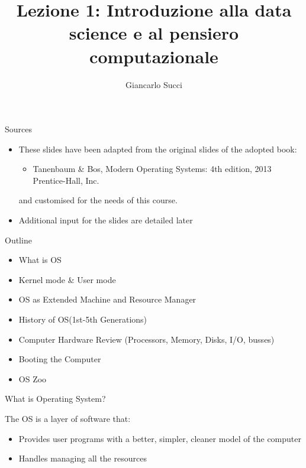 \documentclass{beamer}
\title[L01]{Lezione 1: Introduzione alla data science e al pensiero computazionale} %
\author[{\tiny Giancarlo Succi }]{Giancarlo Succi } %
\institute[unibo] %
\date{Week 01 - Lecture

Chapter 1.1-1.4 \& 1.8, C} %
\begin{document}
\begin{frame}
\titlepage %
\end{frame}



\begin{frame}
{\centerline{Sources}}
\begin{itemize}
    \item These slides have been adapted from the original slides of the adopted book: 
    \begin{itemize}
    \item Tanenbaum \& Bos, Modern  Operating Systems: 4th edition, 2013 Prentice-Hall, Inc.
    \end{itemize}
    and customised for the needs of this course.
    \item Additional input for the slides are detailed later
\end{itemize}
\end{frame}

\begin{frame}
{\centerline{Outline}}
\begin{itemize}
    \item What is OS
    \item Kernel mode \& User mode
    \item OS as Extended Machine and Resource Manager 
    \item History of OS(1st-5th Generations)
    \item Computer Hardware Review (Processors, Memory, Disks, I/O, busses)
    \item Booting the Computer
    \item OS Zoo
\end{itemize} 
\end{frame}


\begin{frame}
{\centerline{What is Operating System?}}
The OS is a layer of software that:
\begin{itemize}
    \item Provides user programs with a better, simpler, cleaner model of the computer
    \item Handles managing all the resources
\end{itemize}
\end{frame}
\end{document}
